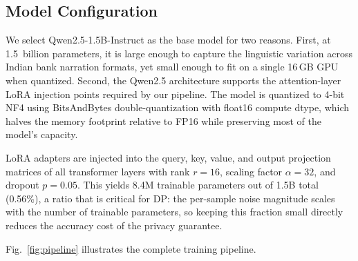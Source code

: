 \documentclass[conference]{IEEEtran}
\begin{document}
\subsection{Model Configuration}

We select Qwen2.5-1.5B-Instruct as the base model for two reasons. First, at 1.5~billion parameters, it is large enough to capture the linguistic variation across Indian bank narration formats, yet small enough to fit on a single 16\,GB GPU when quantized. Second, the Qwen2.5 architecture supports the attention-layer LoRA injection points required by our pipeline. The model is quantized to 4-bit NF4 using BitsAndBytes double-quantization with float16 compute dtype, which halves the memory footprint relative to FP16 while preserving most of the model's capacity.

LoRA adapters are injected into the query, key, value, and output projection matrices of all transformer layers with rank $r=16$, scaling factor $\alpha=32$, and dropout $p=0.05$. This yields 8.4M trainable parameters out of 1.5B total (0.56\%), a ratio that is critical for DP: the per-sample noise magnitude scales with the number of trainable parameters, so keeping this fraction small directly reduces the accuracy cost of the privacy guarantee.

Fig.~\ref{fig:pipeline} illustrates the complete training pipeline.
 
\end{document}
